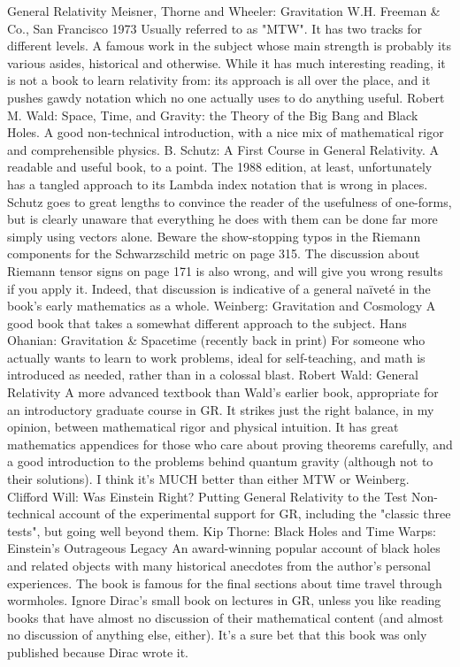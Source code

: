 \documentclass[10pt,a4paper]{book}
\theoremstyle{definition}
\begin{document}
General Relativity
Meisner, Thorne and Wheeler: Gravitation W.H. Freeman \& Co., San Francisco 1973
Usually referred to as "MTW".  It has two tracks for different levels.  A famous work in the subject whose main strength is probably its various asides, historical and otherwise.  While it has much interesting reading, it is not a book to learn relativity from: its approach is all over the place, and it pushes gawdy notation which no one actually uses to do anything useful.
Robert M. Wald: Space, Time, and Gravity: the Theory of the Big Bang and Black Holes.
A good non-technical introduction, with a nice mix of mathematical rigor and comprehensible physics.
B. Schutz: A First Course in General Relativity.
A readable and useful book, to a point.  The 1988 edition, at least, unfortunately has a tangled approach to its Lambda index notation that is wrong in places.  Schutz goes to great lengths to convince the reader of the usefulness of one-forms, but is clearly unaware that everything he does with them can be done far more simply using vectors alone.  Beware the show-stopping typos in the Riemann components for the Schwarzschild metric on page 315.  The discussion about Riemann tensor signs on page 171 is also wrong, and will give you wrong results if you apply it.  Indeed, that discussion is indicative of a general naïveté in the book's early mathematics as a whole.
Weinberg: Gravitation and Cosmology
A good book that takes a somewhat different approach to the subject.
Hans Ohanian: Gravitation \& Spacetime (recently back in print)
For someone who actually wants to learn to work problems, ideal for self-teaching, and math is introduced as needed, rather than in a colossal blast.
Robert Wald: General Relativity
A more advanced textbook than Wald's earlier book, appropriate for an introductory graduate course in GR.  It strikes just the right balance, in my opinion, between mathematical rigor and physical intuition.  It has great mathematics appendices for those who care about proving theorems carefully, and a good introduction to the problems behind quantum gravity (although not to their solutions).  I think it's MUCH better than either MTW or Weinberg.
Clifford Will: Was Einstein Right? Putting General Relativity to the Test
Non-technical account of the experimental support for GR, including the "classic three tests", but going well beyond them.
Kip Thorne: Black Holes and Time Warps: Einstein's Outrageous Legacy
An award-winning popular account of black holes and related objects with many historical anecdotes from the author's personal experiences.  The book is famous for the final sections about time travel through wormholes.
Ignore Dirac's small book on lectures in GR, unless you like reading books that have almost no discussion of their mathematical content (and almost no discussion of anything else, either).  It's a sure bet that this book was only published because Dirac wrote it.
\end{document}
